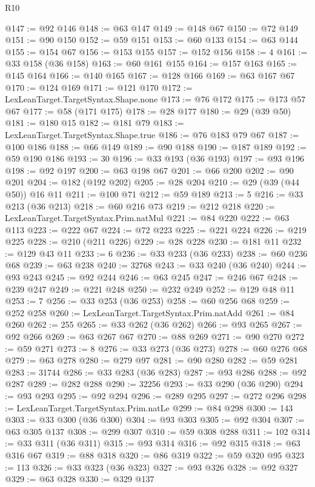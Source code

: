 \begin{lexlean}{R10}
\begin{coremodule}
@147 := @92 @146
@148 := @63 @147
@149 := @148 @67
@150 := @72 @149
@151 := @90 @150
@152 := @59 @151
@153 := @60 @133
@154 := @63 @144
@155 := @154 @67
@156 := @153 @155
@157 := @152 @156
@158 := 4
@161 := @33 @158 (@36 @158)
@163 := @60 @161 @155
@164 := @157 @163
@165 := @145 @164
@166 := @140 @165
@167 := @128 @166
@169 := @63 @167 @67
@170 := @124 @169
@171 := @121 @170
@172 := LexLeanTarget.TargetSyntax.Shape.none
@173 := @76 @172
@175 := @173 @57 @67
@177 := @58 (@171 @175)
@178 := @28 @177
@180 := @29 (@39 @50)
@181 := @180 @15
@182 := @181 @79
@183 := LexLeanTarget.TargetSyntax.Shape.true
@186 := @76 @183 @79 @67
@187 := @100 @186
@188 := @66 @149
@189 := @90 @188
@190 := @187 @189
@192 := @59 @190 @186
@193 := 30
@196 := @33 @193 (@36 @193)
@197 := @93 @196
@198 := @92 @197
@200 := @63 @198 @67
@201 := @66 @200
@202 := @90 @201
@204 := @182 (@192 @202)
@205 := @28 @204
@210 := @29 (@39 (@44 @50)) @16 @11
@211 := @100 @71
@212 := @59 @189
@213 := 5
@216 := @33 @213 (@36 @213)
@218 := @60 @216 @73
@219 := @212 @218
@220 := LexLeanTarget.TargetSyntax.Prim.natMul
@221 := @84 @220
@222 := @63 @113
@223 := @222 @67
@224 := @72 @223
@225 := @221 @224
@226 := @219 @225
@228 := @210 (@211 @226)
@229 := @28 @228
@230 := @181 @11
@232 := @129 @43 @11
@233 := 6
@236 := @33 @233 (@36 @233)
@238 := @60 @236 @68
@239 := @63 @238
@240 := 32768
@243 := @33 @240 (@36 @240)
@244 := @93 @243
@245 := @92 @244
@246 := @63 @245
@247 := @246 @67
@248 := @239 @247
@249 := @221 @248
@250 := @232 @249
@252 := @129 @48 @11
@253 := 7
@256 := @33 @253 (@36 @253)
@258 := @60 @256 @68
@259 := @252 @258
@260 := LexLeanTarget.TargetSyntax.Prim.natAdd
@261 := @84 @260
@262 := 255
@265 := @33 @262 (@36 @262)
@266 := @93 @265
@267 := @92 @266
@269 := @63 @267 @67
@270 := @88 @269
@271 := @90 @270
@272 := @59 @271
@273 := 8
@276 := @33 @273 (@36 @273)
@278 := @60 @276 @68
@279 := @63 @278
@280 := @279 @97
@281 := @90 @280
@282 := @59 @281
@283 := 31744
@286 := @33 @283 (@36 @283)
@287 := @93 @286
@288 := @92 @287
@289 := @282 @288
@290 := 32256
@293 := @33 @290 (@36 @290)
@294 := @93 @293
@295 := @92 @294
@296 := @289 @295
@297 := @272 @296
@298 := LexLeanTarget.TargetSyntax.Prim.natLe
@299 := @84 @298
@300 := 143
@303 := @33 @300 (@36 @300)
@304 := @93 @303
@305 := @92 @304
@307 := @63 @305 @137
@308 := @299 @307
@310 := @59 @308 @288
@311 := 102
@314 := @33 @311 (@36 @311)
@315 := @93 @314
@316 := @92 @315
@318 := @63 @316 @67
@319 := @88 @318
@320 := @86 @319
@322 := @59 @320 @95
@323 := 113
@326 := @33 @323 (@36 @323)
@327 := @93 @326
@328 := @92 @327
@329 := @63 @328
@330 := @329 @137

\end{coremodule}
\end{lexlean}
